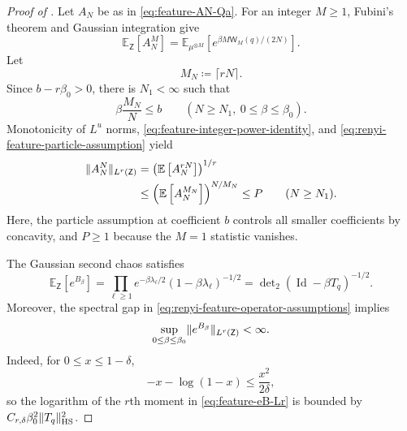 \documentclass[11pt,reqno]{amsart}
\numberwithin{equation}{section}
\theoremstyle{plain}
\theoremstyle{definition}
\DeclarePairedDelimiter{\norm}{\lVert}{\rVert}
\newcommand{\E}{\mathbb E}
\newcommand{\Id}{\operatorname{Id}}
\newcommand{\HS}{\mathrm{HS}}
\newcommand{\be}{\beta}
\begin{document}
\begin{proof}[Proof of ]
Let $A_N$ be as in \eqref{eq:feature-AN-Qa}.  For an integer $M\geq1$, Fubini's theorem and Gaussian integration give
\begin{equation}
 \E_{\mathsf Z}[A_N^M]
 =\E_{\mu^{\otimes M}}
 \left[e^{\be M\mathsf W_M(q)/(2N)}\right].
 \label{eq:feature-integer-power-identity}
\end{equation}
Let
\begin{equation}
 M_N\coloneqq\lceil rN\rceil.
 \label{eq:feature-ceiling}
\end{equation}
Since $b-r\be_0>0$, there is $N_1<\infty$ such that
\begin{equation}
 \be\frac{M_N}{N}\leq b
 \qquad(N\geq N_1,
 \ 0\leq\be\leq\be_0).
 \label{eq:feature-ceiling-buffer}
\end{equation}
Monotonicity of $L^u$ norms, \eqref{eq:feature-integer-power-identity}, and \eqref{eq:renyi-feature-particle-assumption} yield
\begin{align}
 \norm{A_N^N}_{L^r(\mathsf Z)}
 &=\left(\E\left[A_N^{rN}\right]\right)^{1/r}
 \notag\\
 &\leq\left(\E\left[A_N^{M_N}\right]\right)^{N/M_N}
 \leq P
 \qquad(N\geq N_1).
 \label{eq:feature-AN-power-Lr}
\end{align}
Here, the particle assumption at coefficient $b$ controls all smaller coefficients by concavity, and $P\geq1$ because the $M=1$ statistic vanishes.

The Gaussian second chaos satisfies
\begin{equation}
 \E_{\mathsf Z}[e^{B_{\be}}]
 =\prod_{\ell\geq1}
 e^{-\be\lambda_\ell/2}(1-\be\lambda_\ell)^{-1/2}
 =\det\nolimits_2(\Id-\be T_q)^{-1/2}.
 \label{eq:feature-B-determinant}
\end{equation}
Moreover, the spectral gap in \eqref{eq:renyi-feature-operator-assumptions} implies
\begin{equation}
 \sup_{0\leq\be\leq\be_0}
 \norm{e^{B_{\be}}}_{L^r(\mathsf Z)}<\infty.
 \label{eq:feature-eB-Lr}
\end{equation}
Indeed, for $0\leq x\leq1-\delta$,
\begin{equation}
 -x-\log(1-x)\leq\frac{x^2}{2\delta},
 \label{eq:feature-scalar-determinant-bound}
\end{equation}
so the logarithm of the $r$th moment in \eqref{eq:feature-eB-Lr} is bounded by $C_{r,\delta}\be_0^2\norm{T_q}_{\HS}^2$.


\end{proof}
\end{document}
